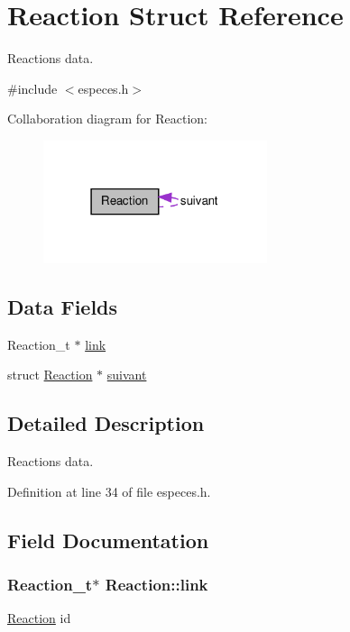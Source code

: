 \hypertarget{structReaction}{
\section{Reaction Struct Reference}
\label{structReaction}
}


Reactions data.  




{\ttfamily \#include $<$especes.h$>$}



Collaboration diagram for Reaction:\nopagebreak
\begin{figure}[H]
\begin{center}
\leavevmode
\includegraphics[width=186pt]{structReaction__coll__graph}
\end{center}
\end{figure}
\subsection*{Data Fields}
\begin{DoxyCompactItemize}
\item 
Reaction\_\-t $\ast$ \hyperlink{structReaction_ac0afd1990830008577958aec1d974e5d}{link}
\item 
struct \hyperlink{structReaction}{Reaction} $\ast$ \hyperlink{structReaction_ae0a12022d2d1cda2fe244b08a59be3d0}{suivant}
\end{DoxyCompactItemize}


\subsection{Detailed Description}
Reactions data. 

Definition at line 34 of file especes.h.



\subsection{Field Documentation}
\hypertarget{structReaction_ac0afd1990830008577958aec1d974e5d}{
\subsubsection[{link}]{\setlength{\rightskip}{0pt plus 5cm}Reaction\_\-t$\ast$ {\bf Reaction::link}}}
\label{structReaction_ac0afd1990830008577958aec1d974e5d}
\hyperlink{structReaction}{Reaction} id 

